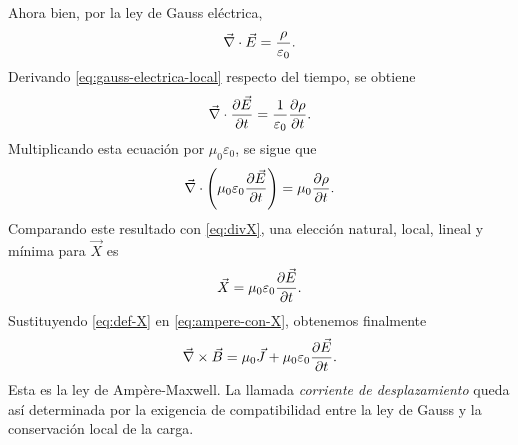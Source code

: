 \documentclass[../main.tex]{subfiles}
\begin{document}
Ahora bien, por la ley de Gauss eléctrica,
\begin{equation}
    \vec\nabla\cdot\vec{E}=\frac{\rho}{\varepsilon_0}.
    \label{eq:gauss-electrica-local}
\end{equation}
Derivando \eqref{eq:gauss-electrica-local} respecto del tiempo, se obtiene
\begin{equation*}
    \vec\nabla\cdot\frac{\partial \vec{E}}{\partial t}=\frac{1}{\varepsilon_0}\frac{\partial \rho}{\partial t}.
\end{equation*}
Multiplicando esta ecuación por $\mu_0\varepsilon_0$, se sigue que
\begin{equation*}
    \vec\nabla\cdot\left(\mu_0\varepsilon_0\frac{\partial \vec{E}}{\partial t}\right)=\mu_0\frac{\partial \rho}{\partial t}.
\end{equation*}
Comparando este resultado con \eqref{eq:divX}, una elección natural, local, lineal y mínima para $\vec X$ es
\begin{equation}
    \vec X=\mu_0\varepsilon_0\frac{\partial \vec{E}}{\partial t}.
    \label{eq:def-X}
\end{equation}
Sustituyendo \eqref{eq:def-X} en \eqref{eq:ampere-con-X}, obtenemos finalmente
\begin{equation*}
    \vec\nabla\times\vec{B}=\mu_0\vec{J}+\mu_0\varepsilon_0\frac{\partial \vec{E}}{\partial t}.
\end{equation*}
Esta es la ley de Ampère-Maxwell. La llamada \textit{corriente de desplazamiento} queda así determinada por la exigencia de compatibilidad entre la ley de Gauss y la conservación local de la carga.
\end{document}
